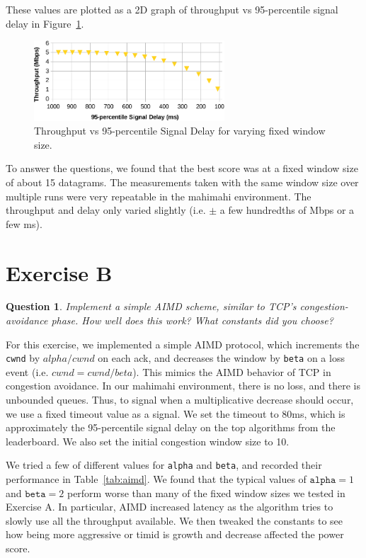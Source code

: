 \documentclass[twoside]{article}
\newtheorem{question}[theorem]{Question}
\begin{document}
These values are plotted as a 2D graph of throughput vs 95-percentile signal
delay in Figure~\ref{fig:exa}.

\begin{figure}[h]
  \centering
  \includegraphics[height=3cm]{./img/exa_fig.pdf}
  \caption{Throughput vs 95-percentile Signal Delay for varying fixed window size.}
  \label{fig:exa}
\end{figure}

To answer the questions, we found that the best score was at a fixed window
size of about 15 datagrams. The measurements taken with the same window size
over multiple runs were very repeatable in the mahimahi environment. The
throughput and delay only varied slightly (i.e. $\pm$ a few hundredths of Mbps
or a few ms).

\vfill
\pagebreak

\section*{Exercise B}
\begin{question}
  Implement a simple AIMD scheme, similar to TCP's congestion-avoidance phase.
  How well does this work? What constants did you choose?
\end{question}

For this exercise, we implemented a simple AIMD protocol, which increments the
\texttt{cwnd} by $alpha/cwnd$ on each ack, and decreases the window by
\texttt{beta} on a loss event (i.e. $cwnd = cwnd / beta$).
This mimics the AIMD behavior of TCP in congestion avoidance.
In our mahimahi environment, there is no loss, and there is unbounded queues.
Thus, to signal when a multiplicative decrease should occur, we use a fixed
timeout value as a signal. We set the timeout to 80ms, which is approximately
the 95-percentile signal delay on the top algorithms from the leaderboard.
We also set the initial congestion window size to 10.

We tried a few of different values for \texttt{alpha} and \texttt{beta},
and recorded their performance in Table~\ref{tab:aimd}.
We found that the typical values of $\texttt{alpha} = 1$ and $\texttt{beta} = 2$
perform worse than many of the fixed window sizes we tested in Exercise A.
In particular, AIMD increased latency as the algorithm tries to slowly use
all the throughput available. We then tweaked the constants to see how being
more aggressive or timid is growth and decrease affected the power score.
\end{document}
